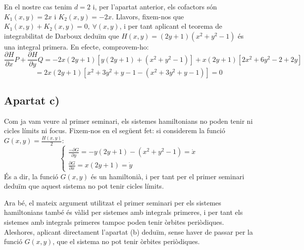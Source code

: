 \documentclass[10pt,a4paper]{article}
\begin{document}
En el nostre cas tenim $d=2$ i, per l'apartat anterior, els cofactors són $K_1(x,y)=2x$ i $K_2(x,y)=-2x$. Llavors, fixem-nos que $K_1(x,y)+K_2(x,y)=0, \ \forall (x,y)$, i per tant aplicant el teorema de integrabilitat de Darboux deduïm que $H(x,y)=(2y+1)(x^2+y^2-1)$ és una integral primera. En efecte, comprovem-ho:
$$\frac{\partial H}{\partial x}P+\frac{\partial H}{\partial y}Q=-2x(2y+1)[y(2y+1)+(x^2+y^2-1)]+x(2y+1)[2x^2+6y^2-2+2y]$$
$$
  =2x(2y+1)[x^2+3y^2+y-1-(x^2+3y^2+y-1)]=0$$
\subsection*{Apartat c)}
Com ja vam veure al primer seminari, els sistemes hamiltonians no poden tenir ni cicles límits ni focus. Fixem-nos en el següent fet: si considerem la funció $G(x,y)=\frac{H(x,y)}{2}$:
\begin{equation}
  \begin{cases}
    \frac{-\partial G}{\partial y}=-y(2y+1)-(x^2+y^2-1)=\dot{x} \\
    \frac{\partial G}{\partial x}=x(2y+1)=\dot{y}
  \end{cases}
\end{equation}
És a dir, la funció $G(x,y)$ és un hamiltonià, i per tant per el primer seminari deduïm que aquest sistema no pot tenir cicles límits.
\par
Ara bé, el mateix argument utilitzat el primer seminari per els sistemes hamiltonians també és vàlid per sistemes amb integrals primeres, i per tant els sistemes amb integrals primeres tampoc poden tenir òrbites periòdiques. Aleshores, aplicant directament l'apartat (b) deduïm, sense haver de passar per la funció $G(x,y)$, que el sistema no pot tenir òrbites periòdiques.
\end{document}

